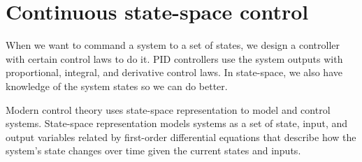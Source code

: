 
\chapter{Continuous state-space control}

When we want to command a \gls{system} to a set of \glspl{state}, we design a
controller with certain \glspl{control law} to do it. PID controllers use the
system \glspl{output} with proportional, integral, and derivative
\glspl{control law}. In state-space, we also have knowledge of the system
\glspl{state} so we can do better.

Modern control theory uses state-space representation to model and control
systems. State-space representation models \glspl{system} as a set of
\gls{state}, \gls{input}, and \gls{output} variables related by first-order
differential equations that describe how the \gls{system}'s \gls{state} changes
over time given the current \glspl{state} and \glspl{input}.

\renewcommand*{\chapterpath}{\partpath/continuous-state-space-control}












